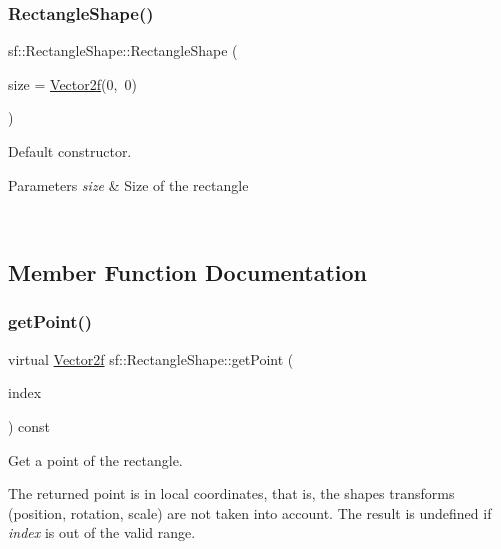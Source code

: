 \subsubsection{\texorpdfstring{RectangleShape()}{RectangleShape()}}
{\footnotesize\ttfamily sf\+::\+Rectangle\+Shape\+::\+Rectangle\+Shape (\begin{DoxyParamCaption}\item[{const \mbox{\hyperlink{classsf_1_1_vector2}{Vector2f}} \&}]{size = {\ttfamily \mbox{\hyperlink{classsf_1_1_vector2}{Vector2f}}(0,~0)} }\end{DoxyParamCaption})\hspace{0.3cm}{\ttfamily [explicit]}}



Default constructor. 


\begin{DoxyParams}{Parameters}
{\em size} & Size of the rectangle \begin{DoxyVerb}\end{DoxyVerb}
 \\
\hline
\end{DoxyParams}


\subsection{Member Function Documentation}
\mbox{\label{classsf_1_1_rectangle_shape_a3909f1a1946930ff5ae17c26206c0f81}} 
\subsubsection{\texorpdfstring{getPoint()}{getPoint()}}
{\footnotesize\ttfamily virtual \mbox{\hyperlink{classsf_1_1_vector2}{Vector2f}} sf\+::\+Rectangle\+Shape\+::get\+Point (\begin{DoxyParamCaption}\item[{std\+::size\+\_\+t}]{index }\end{DoxyParamCaption}) const\hspace{0.3cm}{\ttfamily [virtual]}}



Get a point of the rectangle. 

The returned point is in local coordinates, that is, the shape\textquotesingle{}s transforms (position, rotation, scale) are not taken into account. The result is undefined if {\itshape index} is out of the valid range.



